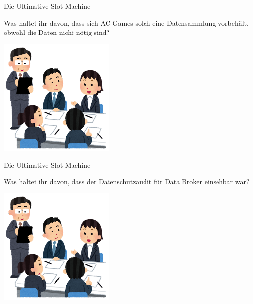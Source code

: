 \begin{frame}{Die Ultimative Slot Machine}
	\centering


	\Large
    Was haltet ihr davon, dass sich AC-Games solch eine Datensammlung vorbehält, obwohl die Daten nicht nötig sind?

	\includegraphics[width=0.425\textwidth]{images/discussion.png}
\end{frame}



\begin{frame}{Die Ultimative Slot Machine}
	\centering


	\Large
	Was haltet ihr davon, dass der Datenschutzaudit für Data Broker einsehbar war?

	\includegraphics[width=0.425\textwidth]{images/discussion.png}
\end{frame}
